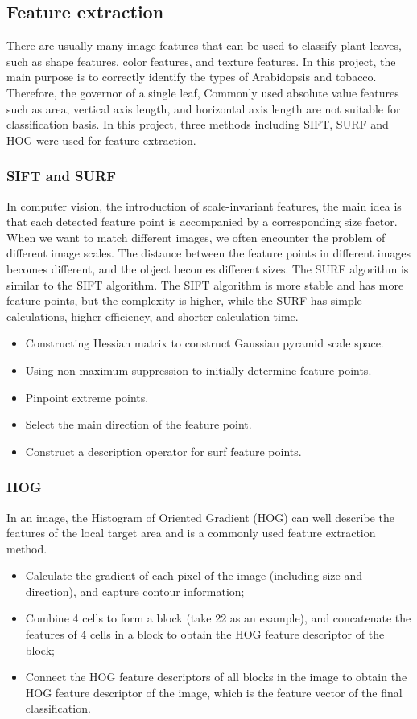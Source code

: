 \documentclass[conference]{IEEEtran}
\begin{document}
\subsection{Feature extraction}\label{AA}
There are usually many image features that can be used to classify plant leaves, such as shape features, color features, and texture features. In this project, the main purpose is to correctly identify the types of Arabidopsis and tobacco. Therefore, the governor of a single leaf, Commonly used absolute value features such as area, vertical axis length, and horizontal axis length are not suitable for classification basis. In this project, three methods including SIFT, SURF and HOG were used for feature extraction.

\subsubsection{SIFT and SURF}
In computer vision, the introduction of scale-invariant features, the main idea is that each detected feature point is accompanied by a corresponding size factor. When we want to match different images, we often encounter the problem of different image scales. The distance between the feature points in different images becomes different, and the object becomes different sizes. The SURF algorithm is similar to the SIFT algorithm. The SIFT algorithm is more stable and has more feature points, but the complexity is higher, while the SURF has simple calculations, higher efficiency, and shorter calculation time.
\begin{itemize}
\item Constructing Hessian matrix to construct Gaussian pyramid scale space.
\item Using non-maximum suppression to initially determine feature points.
\item Pinpoint extreme points.
\item Select the main direction of the feature point.
\item Construct a description operator for surf feature points.
\end{itemize}

\subsubsection{HOG}
In an image, the Histogram of Oriented Gradient (HOG) can well describe the features of the local target area and is a commonly used feature extraction method.
\begin{itemize}
\item Calculate the gradient of each pixel of the image (including size and direction), and capture contour information;
\item Combine 4 cells to form a block (take 22 as an example), and concatenate the features of 4 cells in a block to obtain the HOG feature descriptor of the block;
\item Connect the HOG feature descriptors of all blocks in the image to obtain the HOG feature descriptor of the image, which is the feature vector of the final classification.
\end{itemize}
\end{document}
